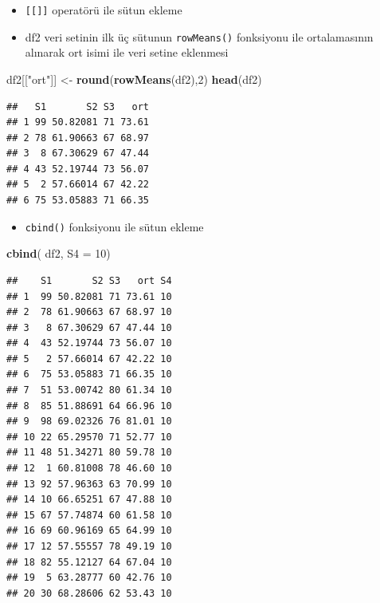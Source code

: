 \documentclass[
  oneside]{book}
\newenvironment{Shaded}{\begin{snugshade}}{\end{snugshade}}
\newcommand{\AttributeTok}[1]{\textcolor[rgb]{0.13,0.29,0.53}{#1}}
\newcommand{\DecValTok}[1]{\textcolor[rgb]{0.00,0.00,0.81}{#1}}
\newcommand{\FunctionTok}[1]{\textcolor[rgb]{0.13,0.29,0.53}{\textbf{#1}}}
\newcommand{\NormalTok}[1]{#1}
\newcommand{\OtherTok}[1]{\textcolor[rgb]{0.56,0.35,0.01}{#1}}
\newcommand{\StringTok}[1]{\textcolor[rgb]{0.31,0.60,0.02}{#1}}
\providecommand{\tightlist}{%
  \setlength{\itemsep}{0pt}\setlength{\parskip}{0pt}}
\begin{document}
\begin{itemize}
\item
  \texttt{{[}{[}{]}{]}} operatörü ile sütun ekleme
\item
  df2 veri setinin ilk üç sütunun \texttt{rowMeans()} fonksiyonu ile ortalamasının alınarak ort isimi ile veri setine eklenmesi
\end{itemize}

\begin{Shaded}
\begin{Highlighting}[]
\NormalTok{df2[[}\StringTok{"ort"}\NormalTok{]] }\OtherTok{\textless{}{-}} \FunctionTok{round}\NormalTok{(}\FunctionTok{rowMeans}\NormalTok{(df2),}\DecValTok{2}\NormalTok{)}
\FunctionTok{head}\NormalTok{(df2)}
\end{Highlighting}
\end{Shaded}

\begin{verbatim}
##   S1       S2 S3   ort
## 1 99 50.82081 71 73.61
## 2 78 61.90663 67 68.97
## 3  8 67.30629 67 47.44
## 4 43 52.19744 73 56.07
## 5  2 57.66014 67 42.22
## 6 75 53.05883 71 66.35
\end{verbatim}

\begin{itemize}
\tightlist
\item
  \texttt{cbind()} fonksiyonu ile sütun ekleme
\end{itemize}

\begin{Shaded}
\begin{Highlighting}[]
\FunctionTok{cbind}\NormalTok{( df2, }\AttributeTok{S4 =} \DecValTok{10}\NormalTok{)}
\end{Highlighting}
\end{Shaded}

\begin{verbatim}
##    S1       S2 S3   ort S4
## 1  99 50.82081 71 73.61 10
## 2  78 61.90663 67 68.97 10
## 3   8 67.30629 67 47.44 10
## 4  43 52.19744 73 56.07 10
## 5   2 57.66014 67 42.22 10
## 6  75 53.05883 71 66.35 10
## 7  51 53.00742 80 61.34 10
## 8  85 51.88691 64 66.96 10
## 9  98 69.02326 76 81.01 10
## 10 22 65.29570 71 52.77 10
## 11 48 51.34271 80 59.78 10
## 12  1 60.81008 78 46.60 10
## 13 92 57.96363 63 70.99 10
## 14 10 66.65251 67 47.88 10
## 15 67 57.74874 60 61.58 10
## 16 69 60.96169 65 64.99 10
## 17 12 57.55557 78 49.19 10
## 18 82 55.12127 64 67.04 10
## 19  5 63.28777 60 42.76 10
## 20 30 68.28606 62 53.43 10
\end{verbatim}
\end{document}
